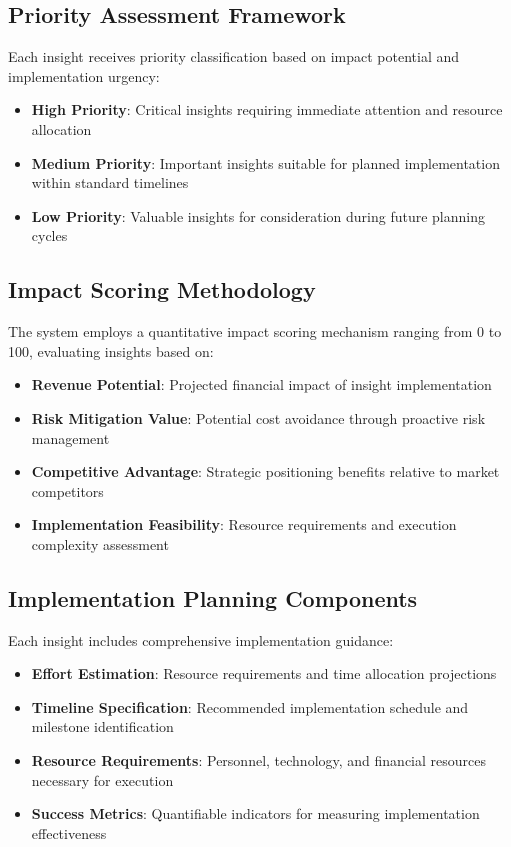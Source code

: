 \documentclass{article}
\begin{document}
\subsection{Priority Assessment Framework}
Each insight receives priority classification based on impact potential and implementation urgency:

\begin{itemize}
    \item \textbf{High Priority}: Critical insights requiring immediate attention and resource allocation
    \item \textbf{Medium Priority}: Important insights suitable for planned implementation within standard timelines
    \item \textbf{Low Priority}: Valuable insights for consideration during future planning cycles
\end{itemize}

\subsection{Impact Scoring Methodology}
The system employs a quantitative impact scoring mechanism ranging from 0 to 100, evaluating insights based on:

\begin{itemize}
    \item \textbf{Revenue Potential}: Projected financial impact of insight implementation
    \item \textbf{Risk Mitigation Value}: Potential cost avoidance through proactive risk management
    \item \textbf{Competitive Advantage}: Strategic positioning benefits relative to market competitors
    \item \textbf{Implementation Feasibility}: Resource requirements and execution complexity assessment
\end{itemize}

\subsection{Implementation Planning Components}
Each insight includes comprehensive implementation guidance:

\begin{itemize}
    \item \textbf{Effort Estimation}: Resource requirements and time allocation projections
    \item \textbf{Timeline Specification}: Recommended implementation schedule and milestone identification
    \item \textbf{Resource Requirements}: Personnel, technology, and financial resources necessary for execution
    \item \textbf{Success Metrics}: Quantifiable indicators for measuring implementation effectiveness
\end{itemize}
\end{document}
